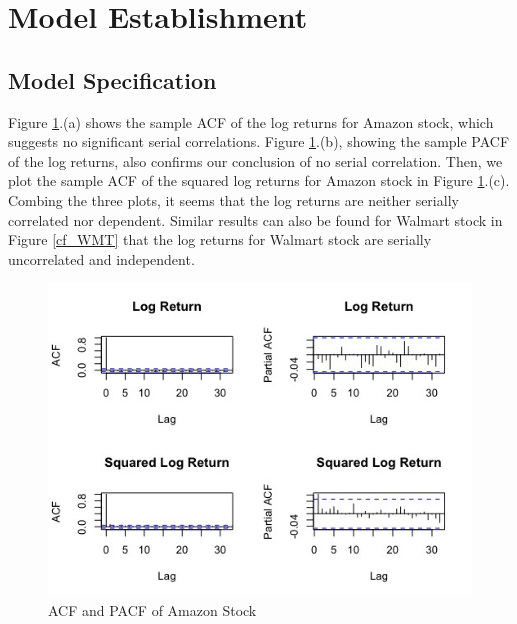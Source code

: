 \documentclass[paper=a4, fontsize=13pt]{article}
\begin{document}
\section{Model Establishment}
\subsection{Model Specification}
Figure \ref{cf_AMZN}.(a) shows the sample ACF of the log returns for Amazon stock, which suggests no significant serial correlations. Figure \ref{cf_AMZN}.(b), showing the sample PACF of the log returns, also confirms our conclusion of no serial correlation. Then, we plot the sample ACF of the squared log returns for Amazon stock in Figure \ref{cf_AMZN}.(c). Combing the three plots, it seems that the log returns are neither serially correlated nor dependent. Similar results can also be found for Walmart stock in Figure \ref{cf_WMT} that the log returns for Walmart stock are serially uncorrelated and independent.

\begin{figure}[!htbp]
\centering
\includegraphics[scale = 0.7]{img/cf_AMZN}
\caption{ACF and PACF of Amazon Stock}
\label{cf_AMZN}
\end{figure}
\end{document}
